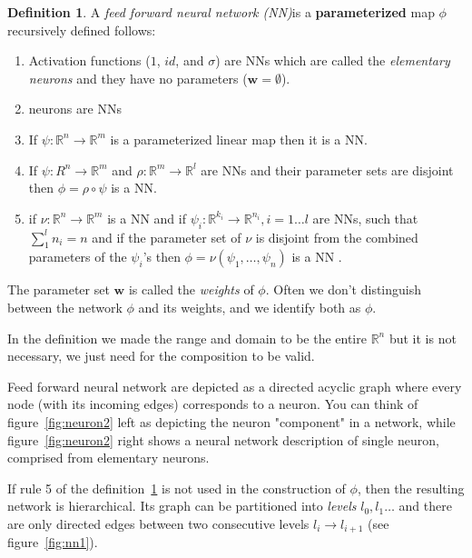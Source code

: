 \documentclass[11pt, a4paper]{report}
\theoremstyle{plain}
\theoremstyle{definition}
\newtheorem{mydef}{Definition}[chapter]
\theoremstyle{remark}
\newcommand{\R}{\mathbb{R}}
\newcommand{\w}{\mathbf{w}}
\begin{document}
\begin{mydef}
\label{def:NN}
A \emph{feed forward neural network (NN)}is a \textbf{parameterized} map $\phi$
recursively defined
follows:
\begin{enumerate}
\item{} 
Activation functions ($1$, $id$, and $\sigma$) are NNs which are called the
\emph{elementary neurons} and they have no parameters ($\w=\emptyset$).
\item{} neurons are NNs
\item{} If $\psi :\R^n \to \R^m$ is a parameterized linear map then it is a NN.
\item{} If $\psi : R^n \to \R^m$
and $\rho: \R^m \to \R^l$ are NNs and their parameter sets are disjoint then $\phi = \rho
\circ \psi$ is a NN.
\item{} if $\nu:\R^n \to \R^m$ is a NN
and if $\psi_i: \R^{k_i} \to \R^{n_i}, i =1 \dots l$ are NNs, such that
$\sum_1^l n_i = n$
and if the parameter set of $\nu$ is disjoint from the combined parameters of
the $\psi_i$'s then
$\phi = \nu(\psi_1, \dots, \psi_n)$ is a NN
.
\end{enumerate}

The parameter set $\w$ is called the \emph{weights} of $\phi$.
Often we don't distinguish between the network $\phi$ and its weights, and
we identify both as $\phi$.

In the definition we made the range and domain to be the entire $\R^n$ but
it is not necessary, we just need for the composition to be valid.
\end{mydef}

Feed forward neural network 
are depicted as a directed acyclic graph where every node (with its incoming
edges) corresponds to a neuron.
You can think of figure~\ref{fig:neuron2} left as depicting the neuron "component" 
in a network, while figure~\ref{fig:neuron2} right shows a neural network
description of single neuron, comprised from elementary neurons.

If rule 5 of the definition~\ref{def:NN} is not used in the construction of $\phi$, then the
resulting network is hierarchical. Its graph can be partitioned into \emph{levels}
$l_0, l_1\dots$ and there are only directed edges between two consecutive
levels $l_i \to l_{i+1}$ (see figure~\ref{fig:nn1}).
\end{document}
